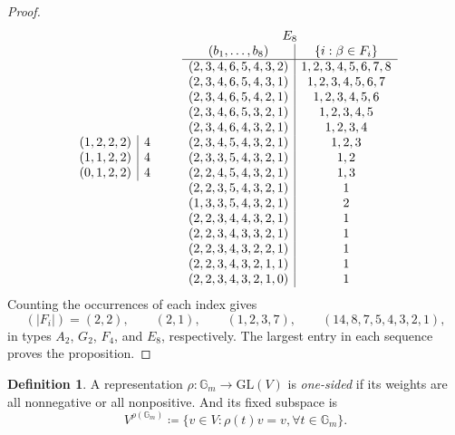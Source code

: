 \documentclass[12pt]{article}
\theoremstyle{definition}
\newtheorem{definition}[theorem]{Definition}
\newcommand{\Gm}{\mathbb G_m}
\newcommand{\GL}{\mathrm{GL}}
\begin{document}
\begin{proof}
{\[\begin{array}{c|c}
    (1,2,2,2)&4\\
    (1,1,2,2)&4\\
    (0,1,2,2)&4
    \end{array}
    \qquad
    \begin{array}{c|c}
    \multicolumn{2}{c}{E_8}\\
    (b_1,\ldots,b_8)&\{i:\beta\in F_i\}\\ \hline
    (2,3,4,6,5,4,3,2)&1,2,3,4,5,6,7,8\\
    (2,3,4,6,5,4,3,1)&1,2,3,4,5,6,7\\
    (2,3,4,6,5,4,2,1)&1,2,3,4,5,6\\
    (2,3,4,6,5,3,2,1)&1,2,3,4,5\\
    (2,3,4,6,4,3,2,1)&1,2,3,4\\
    (2,3,4,5,4,3,2,1)&1,2,3\\
    (2,3,3,5,4,3,2,1)&1,2\\
    (2,2,4,5,4,3,2,1)&1,3\\
    (2,2,3,5,4,3,2,1)&1\\
    (1,3,3,5,4,3,2,1)&2\\
    (2,2,3,4,4,3,2,1)&1\\
    (2,2,3,4,3,3,2,1)&1\\
    (2,2,3,4,3,2,2,1)&1\\
    (2,2,3,4,3,2,1,1)&1\\
    (2,2,3,4,3,2,1,0)&1
    \end{array}
    \]
    }
    Counting the occurrences of each index gives
    \[
        (|F_i|)=(2,2),\qquad(2,1),\qquad(1,2,3,7),\qquad
        (14,8,7,5,4,3,2,1),
    \]
    in types $A_2$, $G_2$, $F_4$, and $E_8$, respectively. The largest entry in each sequence proves the proposition.
\end{proof}

\begin{definition}
    A representation $\rho:\Gm\to\GL(V)$ is \emph{one-sided} if its weights are all nonnegative or all nonpositive. And its fixed subspace is $$V^{\rho(\Gm)}\coloneqq\{v\in V:\rho(t)v=v,\forall t\in\Gm\}.$$
\end{definition}
\end{document}
